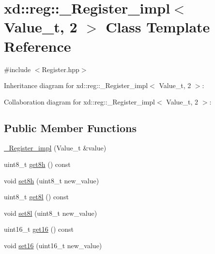 \hypertarget{classxd_1_1reg_1_1___register__impl_3_01_value__t_00_012_01_4}{}\section{xd\+:\+:reg\+:\+:\+\_\+\+Register\+\_\+impl$<$ Value\+\_\+t, 2 $>$ Class Template Reference}
\label{classxd_1_1reg_1_1___register__impl_3_01_value__t_00_012_01_4}


{\ttfamily \#include $<$Register.\+hpp$>$}



Inheritance diagram for xd\+:\+:reg\+:\+:\+\_\+\+Register\+\_\+impl$<$ Value\+\_\+t, 2 $>$\+:


Collaboration diagram for xd\+:\+:reg\+:\+:\+\_\+\+Register\+\_\+impl$<$ Value\+\_\+t, 2 $>$\+:
\subsection*{Public Member Functions}
\begin{DoxyCompactItemize}
\item 
\mbox{\hyperlink{classxd_1_1reg_1_1___register__impl_3_01_value__t_00_012_01_4_a7a3c9066710c8d41544da81bbc72254b}{\+\_\+\+Register\+\_\+impl}} (Value\+\_\+t \&value)
\item 
uint8\+\_\+t \mbox{\hyperlink{classxd_1_1reg_1_1___register__impl_3_01_value__t_00_012_01_4_ae2d002993028c99441a0586ad4a8c099}{get8h}} () const
\item 
void \mbox{\hyperlink{classxd_1_1reg_1_1___register__impl_3_01_value__t_00_012_01_4_afe4f8dbdf1c6f3a58c1477b15f2d11d4}{set8h}} (uint8\+\_\+t new\+\_\+value)
\item 
uint8\+\_\+t \mbox{\hyperlink{classxd_1_1reg_1_1___register__impl_3_01_value__t_00_012_01_4_a9af5b6d2f116fc8775b8fd138ce0f5d2}{get8l}} () const
\item 
void \mbox{\hyperlink{classxd_1_1reg_1_1___register__impl_3_01_value__t_00_012_01_4_ae6b2ae9e60cc0971d58dca0a56b8cf93}{set8l}} (uint8\+\_\+t new\+\_\+value)
\item 
uint16\+\_\+t \mbox{\hyperlink{classxd_1_1reg_1_1___register__impl_3_01_value__t_00_012_01_4_a4286aa58e8f1d8ae31d9eb95ec5396ff}{get16}} () const
\item 
void \mbox{\hyperlink{classxd_1_1reg_1_1___register__impl_3_01_value__t_00_012_01_4_a2430aea808340b1ea418f76c16c3a2e7}{set16}} (uint16\+\_\+t new\+\_\+value)
\end{DoxyCompactItemize}


